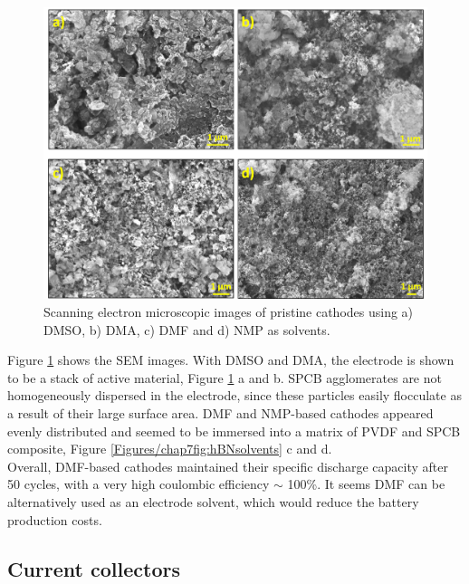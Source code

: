 \begin{figure}[h!]
\centering
\includegraphics[width=\textwidth]{Figures/chap7fig/hBNsolventSEM}
\caption{Scanning electron microscopic images of pristine cathodes using a) DMSO, b) DMA, c) DMF and d) NMP as solvents.}
\label{Figures/chap7fig:hBNsolventSEM}
\end{figure}

Figure \ref{Figures/chap7fig:hBNsolventSEM} shows the SEM images. With DMSO and DMA, the electrode is shown to be a stack of active material, Figure \ref{Figures/chap7fig:hBNsolventSEM} a and b. SPCB agglomerates are not homogeneously dispersed in the electrode, since these particles easily flocculate as a result of their large surface area. DMF and NMP-based cathodes appeared evenly distributed and seemed to be immersed into a matrix of PVDF and SPCB composite, Figure \ref{Figures/chap7fig:hBNsolvents} c and d.\\
Overall, DMF-based cathodes maintained their specific discharge capacity after 50 cycles, with a very high coulombic efficiency $\sim$ 100\%. It seems DMF can be alternatively used as an electrode solvent, which would reduce the battery production costs. 

\subsection*{Current collectors}

